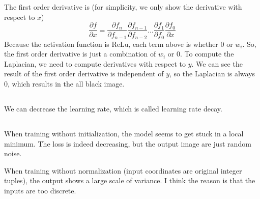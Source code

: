 \documentclass[12pt]{article}
\begin{document}
The first order derivative is (for simplicity, we only show the derivative with respect to $x$)
\begin{equation}
    \frac{\partial f}{\partial x} = \frac{\partial f_n}{\partial f_{n-1}} \frac{\partial f_{n-1}}{\partial f_{n-2}} \dots \frac{\partial f_1}{\partial f_0} \frac{\partial f_0}{\partial x} \nonumber
\end{equation}
Because the activation function is ReLu, each term above is whether 0 or $w_i$. So, the first order derivative is just a combination of $w_i$ or 0. To compute the Laplacian, we need to compute derivatives with respect to $y$. We can see the result of the first order derivative is independent of $y$, so the Laplacian is always 0, which results in the all black image.

\subsection{}
We can decrease the learning rate, which is called learning rate decay.

\subsection{}
When training without initialization, the model seems to get stuck in a local minimum. The loss is indeed decreasing, but the output image are just random noise. 

When training without normalization (input coordinates are original integer tuples), the output shows a large scale of variance. I think the reason is that the inputs are too discrete.
\end{document}
